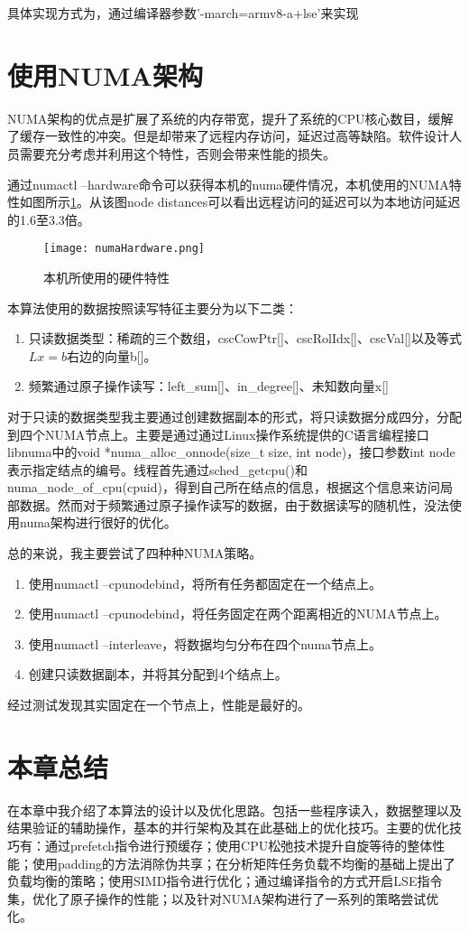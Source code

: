 具体实现方式为，通过编译器参数'-march=armv8-a+lse'来实现

\section{使用NUMA架构}

NUMA架构的优点是扩展了系统的内存带宽，提升了系统的CPU核心数目，缓解了缓存一致性的冲突。但是却带来了远程内存访问，延迟过高等缺陷。软件设计人员需要充分考虑并利用这个特性，否则会带来性能的损失。

通过numactl --hardware命令可以获得本机的numa硬件情况，本机使用的NUMA特性如图所示\ref{numaHardware}。从该图node distances可以看出远程访问的延迟可以为本地访问延迟的1.6至3.3倍。

\begin{figure}[htbp]
    \centering
    \texttt{[image: numaHardware.png]}
    \caption{本机所使用的硬件特性}
    \label{numaHardware}
\end{figure}

本算法使用的数据按照读写特征主要分为以下二类：
\begin{enumerate} \setlength{\itemsep}{0pt}
    \item 只读数据类型：稀疏的三个数组，cscCowPtr[]、cscRolIdx[]、cscVal[]以及等式$Lx=b$右边的向量b[]。
    \item 频繁通过原子操作读写：left\_sum[]、in\_degree[]、未知数向量x[]
\end{enumerate}

对于只读的数据类型我主要通过创建数据副本的形式，将只读数据分成四分，分配到四个NUMA节点上。主要是通过通过Linux操作系统提供的C语言编程接口\cite{libnuma}libnuma中的void *numa\_alloc\_onnode(size\_t size, int node)，接口参数int node表示指定结点的编号。线程首先通过sched\_getcpu()和numa\_node\_of\_cpu(cpuid)，得到自己所在结点的信息，根据这个信息来访问局部数据。然而对于频繁通过原子操作读写的数据，由于数据读写的随机性，没法使用numa架构进行很好的优化。

总的来说，我主要尝试了四种种NUMA策略。
\begin{enumerate} \setlength{\itemsep}{0pt}
    \item 使用numactl --cpunodebind，将所有任务都固定在一个结点上。
    \item 使用numactl --cpunodebind，将任务固定在两个距离相近的NUMA节点上。
    \item 使用numactl --interleave，将数据均匀分布在四个numa节点上。
    \item 创建只读数据副本，并将其分配到4个结点上。
\end{enumerate}

经过测试发现其实固定在一个节点上，性能是最好的。

\section{本章总结}

在本章中我介绍了本算法的设计以及优化思路。包括一些程序读入，数据整理以及结果验证的辅助操作，基本的并行架构及其在此基础上的优化技巧。主要的优化技巧有：通过prefetch指令进行预缓存；使用CPU松弛技术提升自旋等待的整体性能；使用padding的方法消除伪共享；在分析矩阵任务负载不均衡的基础上提出了负载均衡的策略；使用SIMD指令进行优化；通过编译指令的方式开启LSE指令集，优化了原子操作的性能；以及针对NUMA架构进行了一系列的策略尝试优化。


\endinput